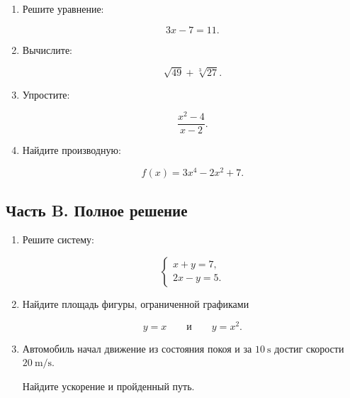 \documentclass[12pt,a4paper]{article}
\theoremstyle{definition}
\theoremstyle{remark}
\begin{document}
\begin{enumerate}[label=\textbf{A\arabic*.}]
    \item Решите уравнение:

    \[
        3x-7=11.
    \]

    \vspace{10mm}

    \item Вычислите:

    \[
        \sqrt{49}+\sqrt[3]{27}.
    \]

    \vspace{10mm}

    \item Упростите:

    \[
        \frac{x^2-4}{x-2}.
    \]

    \vspace{10mm}

    \item Найдите производную:

    \[
        f(x)=3x^4-2x^2+7.
    \]

    \vspace{10mm}
\end{enumerate}

\subsection*{Часть B. Полное решение}

\begin{enumerate}[label=\textbf{B\arabic*.}]
    \item Решите систему:

    \[
    \begin{cases}
        x+y=7,\\
        2x-y=5.
    \end{cases}
    \]

    \vspace{25mm}

    \item Найдите площадь фигуры, ограниченной графиками

    \[
        y=x
        \qquad\text{и}\qquad
        y=x^2.
    \]

    \vspace{30mm}

    \item Автомобиль начал движение из состояния покоя и за
    $\SI{10}{\second}$ достиг скорости
    $\SI{20}{\meter\per\second}$.

    Найдите ускорение и пройденный путь.

    \vspace{30mm}
\end{enumerate}
\end{document}
